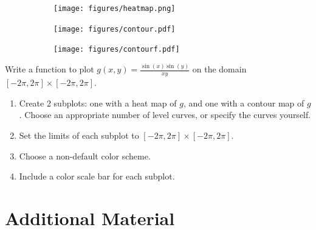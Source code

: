 \begin{figure}[H] %
\captionsetup[subfigure]{justification=centering}
\centering
\begin{framed}
\begin{subfigure}{.33\textwidth}
    \centering
    \texttt{[image: figures/heatmap.png]}
\end{subfigure}%
\begin{subfigure}{.33\textwidth}
    \centering
    \texttt{[image: figures/contour.pdf]}
\end{subfigure}%
\begin{subfigure}{.33\textwidth}
    \centering
    \texttt{[image: figures/contourf.pdf]}
\end{subfigure}
\end{framed}
\end{figure}

\begin{problem} %
\label{prob:heatmap}
Write a function to plot $g(x,y) = \frac{\sin(x)\sin(y)}{xy}$ on the domain $[-2\pi,2\pi] \times [-2\pi,2\pi]$.

\begin{enumerate}
\item Create 2 subplots: one with a heat map of $g$, and one with a contour map of $g$.
Choose an appropriate number of level curves, or specify the curves yourself.
\item Set the limits of each subplot to $[-2\pi,2\pi] \times [-2\pi,2\pi]$.
\item Choose a non-default color scheme.
\item Include a color scale bar for each subplot.
\end{enumerate}
\end{problem}

\newpage

\section*{Additional Material} %

